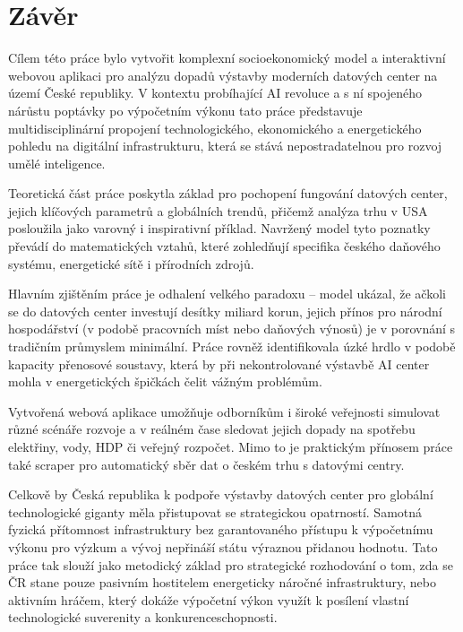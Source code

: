\chapter{Závěr}
\label{chap:zaver}

Cílem této práce bylo vytvořit komplexní socioekonomický model a interaktivní webovou aplikaci pro analýzu dopadů výstavby moderních datových center na území České republiky. V kontextu probíhající AI revoluce a s ní spojeného nárůstu poptávky po výpočetním výkonu tato práce představuje multidisciplinární propojení technologického, ekonomického a energetického pohledu na digitální infrastrukturu, která se stává nepostradatelnou pro rozvoj umělé inteligence.

Teoretická část práce poskytla základ pro pochopení fungování datových center, jejich klíčových parametrů a globálních trendů, přičemž analýza trhu v USA posloužila jako varovný i inspirativní příklad. Navržený model tyto poznatky převádí do matematických vztahů, které zohledňují specifika českého daňového systému, energetické sítě i přírodních zdrojů.

Hlavním zjištěním práce je odhalení velkého paradoxu -- model ukázal, že ačkoli se do datových center investují desítky miliard korun, jejich přínos pro národní hospodářství (v podobě pracovních míst nebo daňových výnosů) je v porovnání s tradičním průmyslem minimální. Práce rovněž identifikovala úzké hrdlo v podobě kapacity přenosové soustavy, která by při nekontrolované výstavbě AI center mohla v energetických špičkách čelit vážným problémům.

Vytvořená webová aplikace umožňuje odborníkům i široké veřejnosti simulovat různé scénáře rozvoje a v reálném čase sledovat jejich dopady na spotřebu elektřiny, vody, HDP či veřejný rozpočet. Mimo to je praktickým přínosem práce také scraper pro automatický sběr dat o českém trhu s datovými centry.

Celkově by Česká republika k podpoře výstavby datových center pro globální technologické giganty měla přistupovat se strategickou opatrností. Samotná fyzická přítomnost infrastruktury bez garantovaného přístupu k výpočetnímu výkonu pro výzkum a vývoj nepřináší státu výraznou přidanou hodnotu. Tato práce tak slouží jako metodický základ pro strategické rozhodování o tom, zda se ČR stane pouze pasivním hostitelem energeticky náročné infrastruktury, nebo aktivním hráčem, který dokáže výpočetní výkon využít k posílení vlastní technologické suverenity a konkurenceschopnosti.